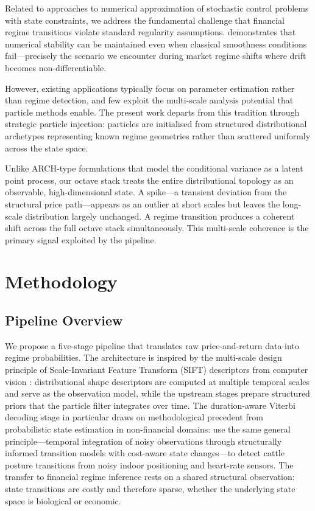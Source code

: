 \documentclass[11pt]{article}
\begin{document}
Related to \citet{Reisinger2015} approaches to numerical approximation
of stochastic control problems with state constraints, we address the
fundamental challenge that financial regime transitions violate standard
regularity assumptions. \citet{Reisinger2015} demonstrates that
numerical stability can be maintained even when classical smoothness
conditions fail---precisely the scenario we encounter during market
regime shifts where drift becomes non-differentiable.

However, existing applications typically focus on parameter estimation
rather than regime detection, and few exploit the multi-scale analysis
potential that particle methods enable. The present work departs from
this tradition through strategic particle injection: particles are
initialised from structured distributional archetypes representing known
regime geometries rather than scattered uniformly across the state
space.

Unlike ARCH-type formulations that model the conditional variance as a
latent point process, our octave stack treats the entire distributional
topology as an observable, high-dimensional state. A spike---a transient
deviation from the structural price path---appears as an outlier at
short scales but leaves the long-scale distribution largely unchanged. A
regime transition produces a coherent shift across the full octave stack
simultaneously. This multi-scale coherence is the primary signal
exploited by the pipeline.

\section{Methodology}

\subsection{Pipeline Overview}

We propose a five-stage pipeline that translates raw price-and-return
data into regime probabilities. The architecture is inspired by the
multi-scale design principle of Scale-Invariant Feature Transform (SIFT)
descriptors from computer vision \citep{Lowe2004}: distributional shape
descriptors are computed at multiple temporal scales and serve as the
observation model, while the upstream stages prepare structured priors
that the particle filter integrates over time. The duration-aware
Viterbi decoding stage in particular draws on methodological precedent
from probabilistic state estimation in non-financial domains:
\citet{Behmann2016} use the same general principle---temporal
integration of noisy observations through structurally informed
transition models with cost-aware state changes---to detect cattle
posture transitions from noisy indoor positioning and heart-rate
sensors. The transfer to financial regime inference rests on a shared
structural observation: state transitions are costly and therefore
sparse, whether the underlying state space is biological or economic.
\end{document}
